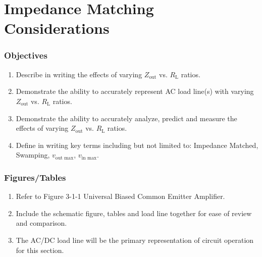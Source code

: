 \documentclass[main.tex]{subfiles}
\begin{document}
\section{Impedance Matching Considerations}
\label{sec:ImpedanceSection}

\subsubsection*{Objectives}
\begin{enumerate}
    \item Describe in writing the effects of varying $Z_{\text{out}}$ vs. $R_{\text{L}}$ ratios.
    \item Demonstrate the ability to accurately represent AC load line(s) with varying $Z_{\text{out}}$ vs. $R_{\text{L}}$ ratios.
    \item Demonstrate the ability to accurately analyze, predict and measure the effects of varying $Z_{\text{out}}$ vs. $R_{\text{L}}$ ratios.
    \item Define in writing key terms including but not limited to: Impedance Matched, Swamping, $v_{\text{out max}}$, $v_{\text{in max}}$.
\end{enumerate}

\subsubsection*{Figures/Tables}
\begin{enumerate}
    \item Refer to Figure 3-1-1 Universal Biased Common Emitter Amplifier.
    \item Include the schematic figure, tables and load line together for ease of review and comparison.
    \item The AC/DC load line will be the primary representation of circuit operation for this section.
\end{enumerate}

\end{document}
